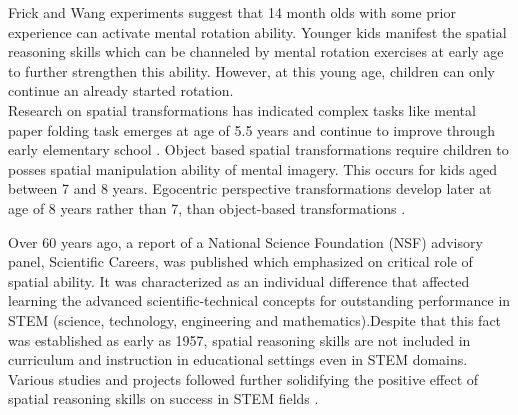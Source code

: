 Frick and Wang \parencite{frick2010round} experiments suggest that 14 month olds with some prior experience can activate mental rotation ability. Younger kids manifest the spatial reasoning skills which can be channeled by mental rotation exercises at early age to further strengthen this ability. However, at this young age, children can only continue an already started rotation.\\
Research on spatial transformations has indicated complex tasks like mental paper folding task emerges at age of 5.5 years and continue to improve through early elementary school \parencite{harris2013new}. Object based spatial transformations require children to posses spatial manipulation ability of mental imagery. This occurs for kids aged between 7 and 8 years. Egocentric perspective transformations develop later at age of 8 years rather than 7, than object-based transformations \parencite{crescentini2014mental}. 

Over 60 years ago, a report of a National Science Foundation (NSF) advisory panel, Scientific Careers, was published \parencite{super1957scientific} which emphasized on critical role of spatial ability. It was characterized as an individual difference that affected learning the advanced scientific-technical concepts for outstanding performance in STEM (science, technology, engineering and mathematics).Despite that this fact was established as early as 1957, spatial reasoning skills are not included in curriculum and instruction in educational settings even in STEM domains. Various studies and projects followed further solidifying the positive effect of spatial reasoning skills on success in STEM fields \parencite{wai2009spatial}. \\

